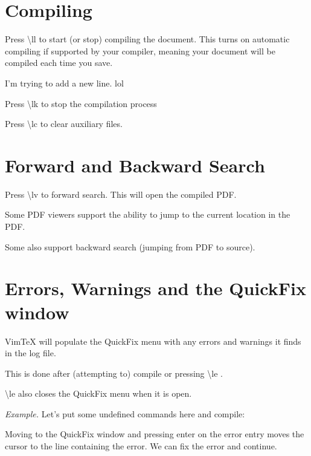 \documentclass{article}
\newcommand{\lk}{\textbackslash{}lk }
\newcommand{\lv}{\textbackslash{}lv }
\newcommand{\lc}{\textbackslash{}lc }
\renewcommand{\ll}{\textbackslash{}ll }
\renewcommand{\le}{\textbackslash{}le }
\begin{document}
\section{Compiling}

Press \ll to start (or stop) compiling the document.
This turns on automatic compiling if supported by your compiler, meaning your
document will be compiled each time you save.

I'm trying to add a new line. lol

Press \lk to stop the compilation process

Press \lc to clear auxiliary files.














\section{Forward and Backward Search}

Press \lv to forward search. This will open the compiled PDF.

Some PDF viewers support the ability to jump to the current location in the PDF.

Some also support backward search (jumping from PDF to source).
















\section{Errors, Warnings and the QuickFix window}

VimTeX will populate the QuickFix menu with any errors and warnings it finds in
the log file.

This is done after (attempting to) compile or pressing \le.

\le also closes the QuickFix menu when it is open.

\emph{Example.} Let's put some undefined commands here and compile:

Moving to the QuickFix window and pressing enter on the error entry moves the
cursor to the line containing the error. We can fix the error and continue.
\end{document}

